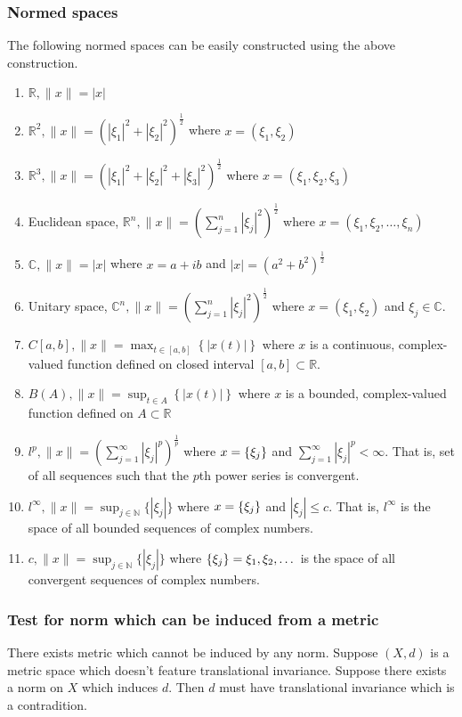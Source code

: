 \subsubsection{Normed spaces}
	The following normed spaces can be easily constructed using the above construction.
\begin{enumerate}
	\item $\mathbb{R}, \|x\| = |x|$
	\item $\mathbb{R}^2, \| x \| = \left( |\xi_1|^2 + |\xi_2|^2 \right)^\frac{1}{2} $ where $x = (\xi_1,\xi_2)$
	\item $\mathbb{R}^3, \| x \|= \left( |\xi_1|^2 + |\xi_2|^2 + |\xi_3|^2 \right)^\frac{1}{2} $ where $x = (\xi_1,\xi_2,\xi_3)$
	\item Euclidean space, $\displaystyle \mathbb{R}^n, \| x \| = \left( \sum_{j=1}^n |\xi_j|^2 \right)^\frac{1}{2}$ where $x = (\xi_1,\xi_2,\dots,\xi_n)$
	\item $\mathbb{C}, \| x \| = |x|$ where $x = a+ib$ and $|x| = (a^2+b^2)^\frac{1}{2}$
	\item Unitary space, $\displaystyle \mathbb{C}^n, \| x \| =  \left( \sum_{j=1}^n |\xi_j|^2 \right)^\frac{1}{2}$ where  $x = (\xi_1,\xi_2)$ and $\xi_j \in \mathbb{C}$.
	\item $\displaystyle C[a,b], \| x \| = \max_{t \in [a,b]} \left\{ |x(t)| \right\}$ where $x$ is a continuous, complex-valued function defined on closed interval $[a,b] \subset \mathbb{R}$.
	\item $\displaystyle B(A), \| x \| = \sup_{t \in A} \left\{ |x(t)| \right\}$ where $x$ is a bounded, complex-valued function defined on $A \subset \mathbb{R}$
	\item $\displaystyle l^p, \| x \| = \left( \sum_{j = 1}^\infty |\xi_j|^p \right)^\frac{1}{p}$ where $x = \left\{\xi_j\right\}$ and $\displaystyle \sum_{j=1}^\infty |\xi_j|^p < \infty$. That is, set of all sequences such that the $p$th power series is convergent.
	\item $\displaystyle l^\infty, \| x \| = \sup_{j \in \mathbb{N}} \{ |\xi_j| \} $ where $x = \left\{\xi_j\right\}$ and $|\xi_j| \le c$. That is, $l^\infty$ is the space of all bounded sequences of complex numbers.
	\item $\displaystyle c, \| x \| = \sup_{j \in \mathbb{N}} \{ |\xi_j| \}$ where $\left\{\xi_j\right\} = \xi_1,\xi_2,\dots$ is the space of all convergent sequences of complex numbers.
\end{enumerate}

\subsubsection{Test for norm which can be induced from a metric}
	There exists metric which cannot be induced by any norm.
	Suppose $(X,d)$ is a metric space which doesn't feature translational invariance.
	Suppose there exists a norm on $X$ which induces $d$.
	Then $d$ must have translational invariance which is a contradition.\\

